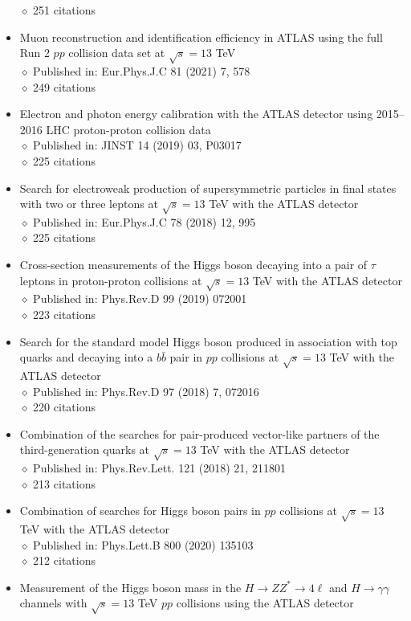 \documentclass[margin, 10pt]{res} %
\begin{document}
\begin{resume}
\begin{itemize}
$\diamond$ 251 citations
\item Muon reconstruction and identification efficiency in ATLAS using the full Run 2 $pp$ collision data set at $\sqrt{s} = 13$ TeV\\
$\diamond$ Published in: Eur.Phys.J.C 81 (2021) 7, 578\\
$\diamond$ 249 citations
\item Electron and photon energy calibration with the ATLAS detector using 2015–2016 LHC proton-proton collision data\\
$\diamond$ Published in: JINST 14 (2019) 03, P03017\\
$\diamond$ 225 citations
\item Search for electroweak production of supersymmetric particles in final states with two or three leptons at $\sqrt{s} = 13$ TeV with the ATLAS detector\\
$\diamond$ Published in: Eur.Phys.J.C 78 (2018) 12, 995\\
$\diamond$ 225 citations
\item Cross-section measurements of the Higgs boson decaying into a pair of $\tau$ leptons in proton-proton collisions at $\sqrt{s} = 13$ TeV with the ATLAS detector\\
$\diamond$ Published in: Phys.Rev.D 99 (2019) 072001\\
$\diamond$ 223 citations
\item Search for the standard model Higgs boson produced in association with top quarks and decaying into a $b\bar{b}$ pair in $pp$ collisions at $\sqrt{s} = 13$ TeV with the ATLAS detector\\
$\diamond$ Published in: Phys.Rev.D 97 (2018) 7, 072016\\
$\diamond$ 220 citations
\item Combination of the searches for pair-produced vector-like partners of the third-generation quarks at $\sqrt{s} = 13$ TeV with the ATLAS detector\\
$\diamond$ Published in: Phys.Rev.Lett. 121 (2018) 21, 211801\\
$\diamond$ 213 citations
\item Combination of searches for Higgs boson pairs in $pp$ collisions at $\sqrt{s} = 13$ TeV with the ATLAS detector\\
$\diamond$ Published in: Phys.Lett.B 800 (2020) 135103\\
$\diamond$ 212 citations
\item Measurement of the Higgs boson mass in the $H \rightarrow ZZ^{*} \rightarrow 4\ell$ and $H \rightarrow \gamma\gamma$ channels with $\sqrt{s} = 13$ TeV $pp$ collisions using the ATLAS detector\\

\end{itemize}
\end{resume}
\end{document}

